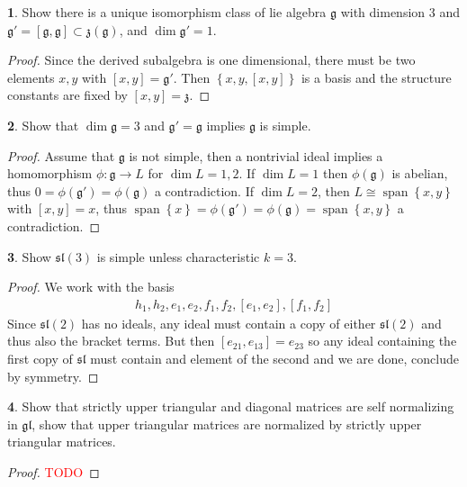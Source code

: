 \documentclass[10.5pt]{article}
\theoremstyle{definition}
\newtheorem{pb}{}
\numberwithin{example}{subsection}
\numberwithin{proposition}{subsection}
\numberwithin{pb}{subsection}
\newcommand{\set}[1]{\left\{#1\right\}}
\begin{document}
        \begin{pb}
            Show there is a unique isomorphism class of lie algebra \(\mathfrak{g}\) with dimension 3 and \(\mathfrak{g}' = [\mathfrak{g},\mathfrak{g}] \subset \mathfrak{z}(\mathfrak{g})\), and \(\dim \mathfrak{g}' = 1\).

            \begin{proof}
                Since the derived subalgebra is one dimensional, there must be two elements \(x,y\) with \([x,y] = \mathfrak{g}'\). Then \(\set{x,y,[x,y]}\) is a basis and the structure constants are fixed by \([x,y] = \mathfrak{z}\).
            \end{proof}
        \end{pb}
        \begin{pb}
            Show that \(\dim \mathfrak{g} = 3\) and \(\mathfrak{g}' = \mathfrak{g}\) implies \(\mathfrak{g}\) is simple.

            \begin{proof}
                Assume that \(\mathfrak{g}\) is not simple, then a nontrivial ideal implies a homomorphism \(\phi: \mathfrak{g} \to L\) for \(\dim L = 1,2\). If \(\dim L = 1\) then \(\phi(\mathfrak{g})\) is abelian, thus \(0 = \phi(\mathfrak{g}') = \phi(\mathfrak{g})\) a contradiction. If \(\dim L = 2\), then \(L \cong \operatorname{span}\set{x,y}\) with \([x,y] = x\), thus \(\operatorname{span}\set{x} = \phi(\mathfrak{g}') = \phi(\mathfrak{g}) = \operatorname{span}\set{x,y}\) a contradiction.
            \end{proof}
        \end{pb}
        \begin{pb}
            Show \(\mathfrak{sl}(3)\) is simple unless characteristic \(k = 3\).
            \begin{proof}
                We work with the basis 
                \begin{align}
                    h_1,h_2,e_1,e_2,f_1,f_2,[e_1,e_2],[f_1,f_2]
                \end{align}
                Since \(\mathfrak{sl}(2)\) has no ideals, any ideal must contain a copy of either \(\mathfrak{sl}(2)\) and thus also the bracket terms. But then \([e_{21},e_{13}] = e_{23}\) so any ideal containing the first copy of \(\mathfrak{sl}\) must contain and element of the second and we are done, conclude by symmetry.
            \end{proof}
        \end{pb}
        \begin{pb}
            Show that strictly upper triangular and diagonal matrices are self normalizing in \(\mathfrak{gl}\), show that upper triangular matrices are normalized by strictly upper triangular matrices.

            \begin{proof}
                \textcolor{red}{TODO}
            \end{proof}
        \end{pb}
\end{document}

